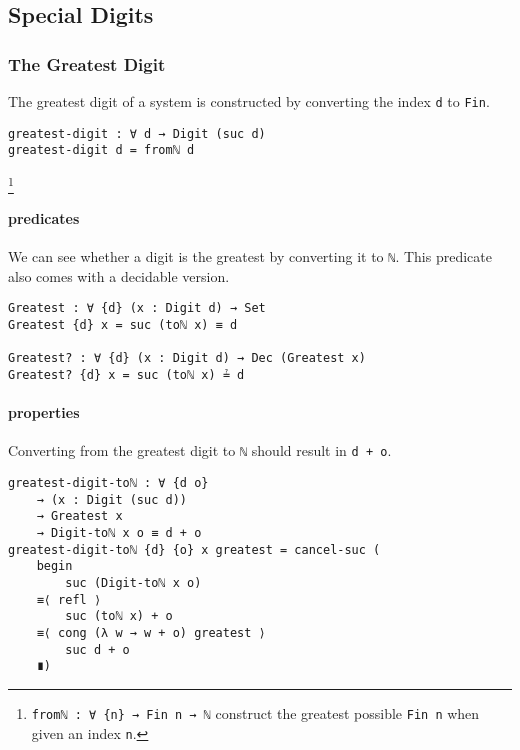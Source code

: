 \documentclass[\main/thesis.tex]{subfiles}
\begin{document}
\subsection{Special Digits}

\subsubsection{The Greatest Digit}

The greatest digit of a system is constructed by converting the index
{\lstinline|d|} to {\lstinline|Fin|}.

\begin{lstlisting}
greatest-digit : ∀ d → Digit (suc d)
greatest-digit d = fromℕ d
\end{lstlisting}
\footnote{
    {\lstinline|fromℕ : ∀ {n} → Fin n → ℕ|}
    \newline\hspace*{4em} construct the greatest possible {\lstinline|Fin n|}
    when given an index {\lstinline|n|}.
}

\paragraph{predicates}

We can see whether a digit is the greatest by converting it to {\lstinline|ℕ|}.
This predicate also comes with a decidable version.

\begin{lstlisting}
Greatest : ∀ {d} (x : Digit d) → Set
Greatest {d} x = suc (toℕ x) ≡ d

Greatest? : ∀ {d} (x : Digit d) → Dec (Greatest x)
Greatest? {d} x = suc (toℕ x) ≟ d
\end{lstlisting}

\paragraph{properties}

Converting from the greatest digit to {\lstinline|ℕ|} should result in
{\lstinline|d + o|}.

\begin{lstlisting}
greatest-digit-toℕ : ∀ {d o}
    → (x : Digit (suc d))
    → Greatest x
    → Digit-toℕ x o ≡ d + o
greatest-digit-toℕ {d} {o} x greatest = cancel-suc (
    begin
        suc (Digit-toℕ x o)
    ≡⟨ refl ⟩
        suc (toℕ x) + o
    ≡⟨ cong (λ w → w + o) greatest ⟩
        suc d + o
    ∎)
\end{lstlisting}
\end{document}
